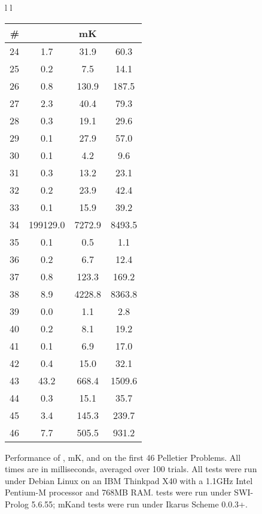 \begin{figure}[h]
\begin{centering}
\begin{tabular}{l l}
\begin{minipage}{2.5in}
\begin{tabular}{| r | c | c | c |} %
  \hline 
  \# & \thinspace \leantap  \thinspace &
  mK\leantap \thinspace & \thinspace \alphatap
  \thinspace %
\\
  \hline
24 & 1.7 & 31.9 & 60.3 \\ 
25 & 0.2 & 7.5 & 14.1 \\ 
26 & 0.8 & 130.9 & 187.5 \\ 
27 & 2.3 & 40.4 & 79.3 \\ 
28 & 0.3 & 19.1 & 29.6 \\ 
29 & 0.1 & 27.9 & 57.0 \\ 
30 & 0.1 & 4.2 & 9.6 \\ 
31 & 0.3 & 13.2 & 23.1 \\ 
32 & 0.2 & 23.9 & 42.4 \\ 
33 & 0.1 & 15.9 & 39.2 \\ 
34 & 199129.0  & 7272.9 & 8493.5 \\ 
35 & 0.1 & 0.5 & 1.1 \\ 
36 & 0.2 & 6.7 & 12.4 \\ 
37 & 0.8 & 123.3 & 169.2 \\ 
38 & 8.9 & 4228.8 & 8363.8 \\ 
39 & 0.0 & 1.1 & 2.8 \\ 
40 & 0.2 & 8.1 & 19.2 \\ 
41 & 0.1 & 6.9 & 17.0 \\ 
42 & 0.4 & 15.0 & 32.1 \\ 
43 & 43.2 & 668.4 & 1509.6 \\ 
44 & 0.3 & 15.1 & 35.7 \\ 
45 & 3.4 & 145.3 & 239.7 \\ 
46 & 7.7 & 505.5 & 931.2 \\ 

  \hline
\end{tabular}
\end{minipage}
\end{tabular}

\caption{Performance of \leantap, mK\leantap, and \alphatapsp on the
  first 46 Pelletier Problems. 
  All times are in milliseconds, averaged over 100 trials.
  All tests were run \mbox{under} Debian
  Linux on an IBM Thinkpad 
  X40 with a 1.1GHz Intel Pentium-M processor and 768MB RAM. 
  \leantapsp tests were run under SWI-Prolog 5.6.55;
  mK\leantapsp and \alphatapsp tests were run under Ikarus Scheme
  0.0.3+.
  \label{fig:performance}}
\end{centering}

\end{figure}


